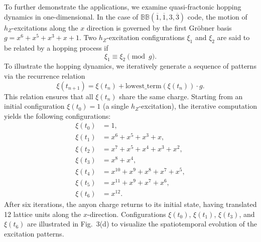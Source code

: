 \documentclass[aps,prl,english,superscriptaddress,twocolumn,tightenlines,showpacs,longbibliography,floatfix,amsfonts]{revtex4-2}
\begin{document}
To further demonstrate the applications, we examine quasi-fractonic hopping dynamics in one-dimensional. In the case of $\mathbb{BB}(\overline{1}, \overline{1}, 3,\overline{3})$ code, the motion of $h_Z$-excitations
along the $x$ direction is governed by the first Gr\"obner basis $g = x^6+x^5+x^3+x+1$. Two $h_Z$-excitation configurations $\xi_1$ and $\xi_2$ are said to be related by a hopping process if
\begin{equation}
	\xi_1 \equiv \xi_2 \pmod g.
\end{equation}
To illustrate the hopping dynamics, we iteratively generate a sequence of patterns via the recurrence relation 
\begin{equation}
	\xi(t_{n+1}) = \xi(t_n) + \text{lowest\_term}(\xi(t_n))\cdot g.
\end{equation} 
This relation ensures that all $\xi(t_n)$ share the same charge. Starting from an initial configuration $\xi(t_0)=1$ (a single $h_Z$-excitation), the iterative computation yields the following configurations:
\begin{align}
	\xi(t_0) &= 1, \\
	\xi(t_1) &= x^6+x^5+x^3+x, \\
	\xi(t_2) &= x^7+x^5+x^4+x^3+x^2, \\
	\xi(t_3) &= x^8+x^4, \\
	\xi(t_4) &= x^{10} + x^9 + x^8 + x^7+x^5, \\
	\xi(t_5) &= x^{11} + x^9 + x^7 + x^6, \\
	\xi(t_6) &= x^{12}.
\end{align}
After six iterations, the anyon charge returns to its initial state, having translated 12 lattice units along the $x$-direction. Configurations $\xi(t_0)$, $\xi(t_1)$, $\xi(t_3)$, and $\xi(t_6)$ are illustrated in Fig.~3(d) to visualize the spatiotemporal evolution of the excitation patterns.
\end{document}
